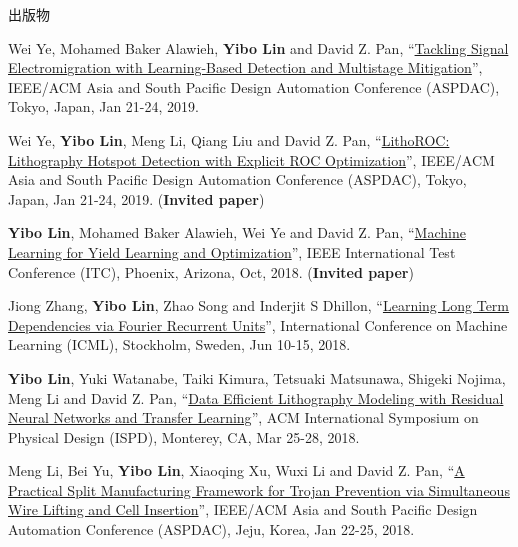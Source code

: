 \begin{rSection}{出版物}
\begin{description}[font=\normalfont, rightmargin=2em]
{}
            

\item[{[C20]}]{
        Wei Ye, Mohamed Baker Alawieh, \textbf{Yibo Lin} and David Z. Pan, 
    ``\href{https://doi.org/10.1145/3287624.3287688}{Tackling Signal Electromigration with Learning-Based Detection and Multistage Mitigation}'', 
    IEEE/ACM Asia and South Pacific Design Automation Conference (ASPDAC), Tokyo, Japan, Jan 21-24, 2019.
    
}
            

\item[{[C19]}]{
        Wei Ye, \textbf{Yibo Lin}, Meng Li, Qiang Liu and David Z. Pan, 
    ``\href{https://doi.org/10.1145/3287624.3288746}{LithoROC: Lithography Hotspot Detection with Explicit ROC Optimization}'', 
    IEEE/ACM Asia and South Pacific Design Automation Conference (ASPDAC), Tokyo, Japan, Jan 21-24, 2019.
    (\textbf{Invited paper})
}
            

\item[{[C18]}]{
        \textbf{Yibo Lin}, Mohamed Baker Alawieh, Wei Ye and David Z. Pan, 
    ``\href{https://doi.org/10.1109/TEST.2018.8624733}{Machine Learning for Yield Learning and Optimization}'', 
    IEEE International Test Conference (ITC), Phoenix, Arizona, Oct, 2018.
    (\textbf{Invited paper})
}
            

\item[{[C17]}]{
        Jiong Zhang, \textbf{Yibo Lin}, Zhao Song and Inderjit S Dhillon, 
    ``\href{https://arxiv.org/pdf/1803.06585.pdf}{Learning Long Term Dependencies via Fourier Recurrent Units}'', 
    International Conference on Machine Learning (ICML), Stockholm, Sweden, Jun 10-15, 2018.
    
}
            

\item[{[C16]}]{
        \textbf{Yibo Lin}, Yuki Watanabe, Taiki Kimura, Tetsuaki Matsunawa, Shigeki Nojima, Meng Li and David Z. Pan, 
    ``\href{https://doi.org/10.1145/3177540.3178242}{Data Efficient Lithography Modeling with Residual Neural Networks and Transfer Learning}'', 
    ACM International Symposium on Physical Design (ISPD), Monterey, CA, Mar 25-28, 2018.
    
}
            

\item[{[C15]}]{
        Meng Li, Bei Yu, \textbf{Yibo Lin}, Xiaoqing Xu, Wuxi Li and David Z. Pan, 
    ``\href{https://doi.org/10.1109/ASPDAC.2018.8297316}{A Practical Split Manufacturing Framework for Trojan Prevention via Simultaneous Wire Lifting and Cell Insertion}'', 
    IEEE/ACM Asia and South Pacific Design Automation Conference (ASPDAC), Jeju, Korea, Jan 22-25, 2018.
    
}
\end{description}
\end{rSection}
